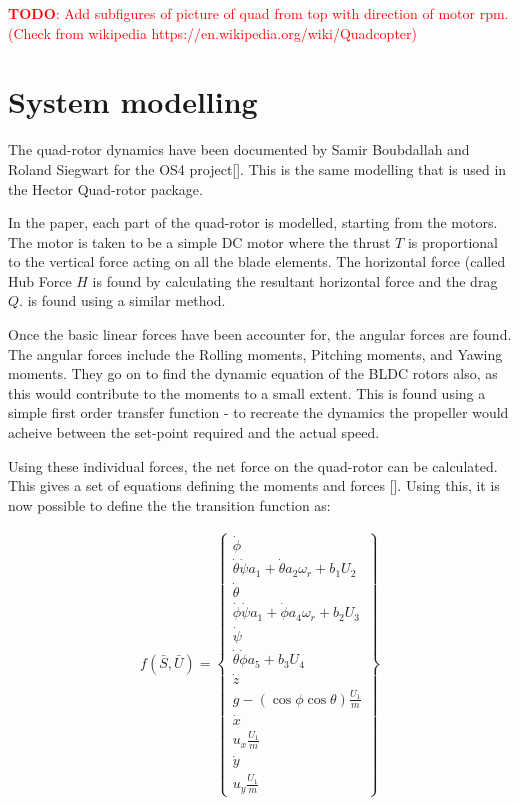 \documentclass[BTech]{iitmdiss}
\newcommand\todo[1]{\textcolor{red}{{\bf TODO}: #1}}
\begin{document}
\todo{Add subfigures of picture of quad from top with direction of motor rpm. (Check from wikipedia https://en.wikipedia.org/wiki/Quadcopter)}

\section{System modelling}

The quad-rotor dynamics have been documented by Samir Boubdallah and Roland Siegwart for the OS4 project[]. This is the same modelling that is used in the Hector Quad-rotor package.

In the paper, each part of the quad-rotor is modelled, starting from the motors. The motor is taken to be a simple DC motor where the thrust $T$ is proportional to the vertical force acting on all the blade elements. The horizontal force (called Hub Force $H$ is found by calculating the resultant horizontal force and the drag $Q$. is found using a similar method.

Once the basic linear forces have been accounter for, the angular forces are found. The angular forces include the Rolling moments, Pitching moments, and Yawing moments. They go on to find the dynamic equation of the BLDC rotors also, as this would contribute to the moments to a small extent. This is found using a simple first order transfer function - to recreate the dynamics the propeller would acheive between the set-point required and the actual speed.

Using these individual forces, the net force on the quad-rotor can be calculated. This gives a set of equations defining the moments and forces [\citet[see equation 7][]{QuadrotorDynamics}]. Using this, it is now possible to define the the transition function as:

\begin{equation} \begin{split}
  f(\bar{S}, \bar{U}) = \left\{
    \begin{array}{c}
      \dot{\phi} \\
      \dot{\theta} \dot{\psi} a_{1} + \dot{\theta} a_{2} \omega_{r} + b_{1} U_{2} \\
      \dot{\theta} \\
      \dot{\phi} \dot{\psi} a_{1} + \dot{\phi} a_{4} \omega_{r} + b_{2} U_{3} \\
      \dot{\psi} \\
      \dot{\theta} \dot{\phi} a_{5} + b_{3} U_{4} \\
      \dot{z} \\
      g  - (\cos{\phi} \cos{\theta})\frac{U_{1}}{m} \\
      \dot{x} \\
      u_{x} \frac{U_{1}}{m} \\
      \dot{y} \\
      u_{y} \frac{U_{1}}{m}
    \end{array}
  \right\}
\end{split} \end{equation}
\end{document}
